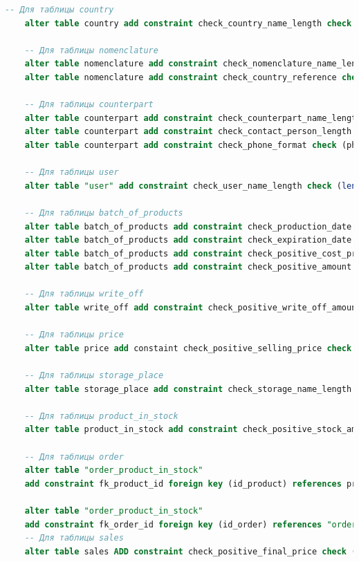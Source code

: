 \begin{lstlisting}[label=lst:constraints, caption=Создание ограничений для таблиц базы данных, language=SQL]
	-- Для таблицы country
	alter table country add constraint check_country_name_length check (length(name) > 0);
	
	-- Для таблицы nomenclature
	alter table nomenclature add constraint check_nomenclature_name_length check (length(name) > 0);
	alter table nomenclature add constraint check_country_reference check (country_id is not null);
	
	-- Для таблицы counterpart
	alter table counterpart add constraint check_counterpart_name_length check (length(name) > 0);
	alter table counterpart add constraint check_contact_person_length check (length(contact_person) > 0);
	alter table counterpart add constraint check_phone_format check (phone ~ '^\+?[0-9]{10,15}$');
	
	-- Для таблицы user
	alter table "user" add constraint check_user_name_length check (length(name) > 1);
	
	-- Для таблицы batch_of_products
	alter table batch_of_products add constraint check_production_date check (production_date <= current_date);
	alter table batch_of_products add constraint check_expiration_date check (expiration_date > production_date);
	alter table batch_of_products add constraint check_positive_cost_price check (cost_price > 0);
	alter table batch_of_products add constraint check_positive_amount check (amount > 0);
	
	-- Для таблицы write_off
	alter table write_off add constraint check_positive_write_off_amount check (amount >= 0);
	
	-- Для таблицы price
	alter table price add constaint check_positive_selling_price check (selling_price > 0);
	
	-- Для таблицы storage_place
	alter table storage_place add constraint check_storage_name_length check (length(name) > 0);
	
	-- Для таблицы product_in_stock
	alter table product_in_stock add constraint check_positive_stock_amount check (amount >= 0);
	
	-- Для таблицы order
	alter table "order_product_in_stock"
	add constraint fk_product_id foreign key (id_product) references product_in_stock;
	
	alter table "order_product_in_stock"
	add constraint fk_order_id foreign key (id_order) references "order";
	-- Для таблицы sales
	alter table sales ADD constraint check_positive_final_price check (final_price > 0);	
\end{lstlisting}
